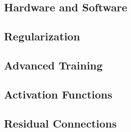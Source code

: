 \documentclass[13pt,compress]{beamer}
\begin{document}
\subsection{Hardware and Software}

\subsection{Regularization}

\subsection{Advanced Training}

\subsection{Activation Functions}

\subsection{Residual Connections}

%
\end{document}

